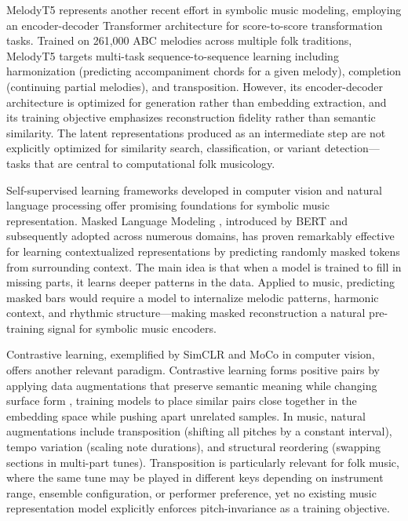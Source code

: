 \documentclass[]{interact}
\theoremstyle{plain}
\theoremstyle{definition}
\theoremstyle{remark}
\begin{document}
MelodyT5 \cite{wu2024melodyt5} represents another recent effort in symbolic music modeling, employing an encoder-decoder Transformer architecture for score-to-score transformation tasks. Trained on 261,000 ABC melodies across multiple folk traditions, MelodyT5 targets multi-task sequence-to-sequence learning including harmonization (predicting accompaniment chords for a given melody), completion (continuing partial melodies), and transposition. However, its encoder-decoder architecture is optimized for generation rather than embedding extraction, and its training objective emphasizes reconstruction fidelity rather than semantic similarity. The latent representations produced as an intermediate step are not explicitly optimized for similarity search, classification, or variant detection—tasks that are central to computational folk musicology.

Self-supervised learning frameworks developed in computer vision and natural language processing offer promising foundations for symbolic music representation. Masked Language Modeling \cite{BERT2019}, introduced by BERT and subsequently adopted across numerous domains, has proven remarkably effective for learning contextualized representations by predicting randomly masked tokens from surrounding context. The main idea is that when a model is trained to fill in missing parts, it learns deeper patterns in the data. Applied to music, predicting masked bars would require a model to internalize melodic patterns, harmonic context, and rhythmic structure—making masked reconstruction a natural pre-training signal for symbolic music encoders.

Contrastive learning, exemplified by SimCLR \cite{jiang2020speech} and MoCo \cite{he2020momentum} in computer vision, offers another relevant paradigm. Contrastive learning forms positive pairs by applying data augmentations that preserve semantic meaning while changing surface form \cite{zhang2024data}, training models to place similar pairs close together in the embedding space while pushing apart unrelated samples. In music, natural augmentations include transposition (shifting all pitches by a constant interval), tempo variation (scaling note durations), and structural reordering (swapping sections in multi-part tunes). Transposition is particularly relevant for folk music, where the same tune may be played in different keys depending on instrument range, ensemble configuration, or performer preference, yet no existing music representation model explicitly enforces pitch-invariance as a training objective.
\end{document}
